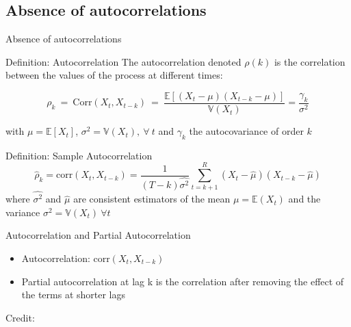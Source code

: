 \documentclass{beamer}
\begin{document}
\subsection{Absence of autocorrelations}
\begin{frame}{Absence of autocorrelations}
\begin{block}{Definition: Autocorrelation}
  The autocorrelation denoted $\rho(k)$ is the correlation between the values of the process at different times:

  \begin{equation*}
    \rho_k \ = \ \text{Corr}(X_t, X_{t-k}) \ = \ \frac{\mathbb{E}\left[ (X_t - \mu)(X_{t-k} - \mu)\right]}{\mathbb{V}(X_t)} = \frac{\gamma_k}{\sigma^2}
  \end{equation*}

with $\mu = \mathbb{E}[X_t]$, $\sigma^2 = \mathbb{V}(X_t), \ \forall \ t$ and $\gamma_k$ the autocovariance of order $k$  
\end{block}
\pause
  \begin{block}{Definition: Sample Autocorrelation}
    \begin{equation*} 
      \hat{\rho}_k = \text{corr}(X_t, X_{t-k}) = \frac{1}{(T-k)\hat{\sigma^2}} \sum_{t=k+1}^{R}(X_t - \hat{\mu})(X_{t-k} - \hat{\mu})
    \end{equation*}
where $\hat{\sigma^2}$ and $\hat{\mu}$ are consistent estimators of the mean $\mu = \mathbb{E}(X_t)$ and the variance $\sigma^2 = \mathbb{V}(X_t)~ \forall t$
  \end{block}
\end{frame}

\begin{frame}{Autocorrelation and Partial Autocorrelation}
  \begin{itemize}
  \item Autocorrelation: $\text{corr}(X_t, X_{t-k})$
  \item Partial autocorrelation at lag k is the correlation after removing the effect of the terms at shorter lags
  \end{itemize}
  
  \hspace*{15pt}\hbox{\scriptsize Credit:} 
\end{frame}
\end{document}
